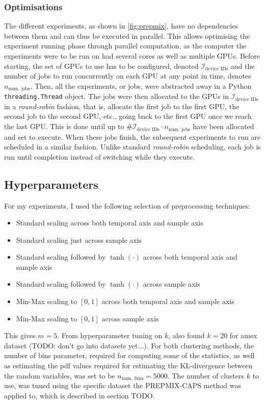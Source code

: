 \documentclass{statsmsc}
\begin{document}
\subsubsection{Optimisations}%
\label{ssub:Optimisations}

The different experiments, as shown in \cref{fig:prepmix}, have no dependencies
between them and can thus be executed in parallel. This allows optimising the
experiment running phase through parallel computation, as the computer the experiments were to
be run on had several cores as well as multiple \acp{GPU}. Before starting, the set of \acp{GPU}
to use has to be configured, denoted $\mathcal{I}_{\textrm{device IDs}}$ and the number of jobs
to run concurrently on each \ac{GPU} at any point in time, denotes $n_{\textrm{num. jobs}}$.
Then, all the experiments, or jobs, were abstracted away in a Python
\texttt{threading.Thread} object. The jobs were then allocated to the \acp{GPU} in
$\mathcal{I}_{\textrm{device IDs}}$ in a \textit{round-robin} fashion, that is, allocate the first
job to the first \ac{GPU}, the second job to the second \ac{GPU}, etc., going back to the first
\ac{GPU} once we reach the last \ac{GPU}. This is done until up to
$\# \mathcal{I}_{\textrm{device IDs}} \cdot n_{\textrm{num. jobs}}$ have been allocated and
set to execute. When these jobs finish, the subsequent experiments to run are scheduled in a similar
fashion. Unlike standard \textit{round-robin} scheduling, each job is run until completion instead
of switching while they execute.

\subsection{Hyperparameters}%
\label{sub:Hyperparameters}

For my experiments, I used the following selection of preprocessing techniques:
\begin{itemize}
    \item Standard scaling across both temporal axis and sample axis
    \item Standard scaling just across sample axis
    \item Standard scaling followed by $\tanh(\cdot)$ across both temporal axis and sample axis
    \item Standard scaling followed by $\tanh(\cdot)$ across sample axis
    \item Min-Max scaling to $[0,1]$ across both temporal axis and sample axis
    \item Min-Max scaling to $[0,1]$ across sample axis
\end{itemize}
This gives $m=5$. From hyperparameter tuning on $k$, also found $k=20$ for amex dataset
(TODO: don't go into datasets yet...).
For both clustering methods, the number of bins parameter, required for computing some of the
statistics, as well as estimating the \ac{pdf} values required for estimating the
\ac{KL-divergence} between the random variables, was set to be
$n_{\textrm{num. bins}}=5000$. The number of clusters $k$ to use, was tuned using the specific
dataset the \ac{PREPMIX-CAPS} method was applied to, which is described in section TODO.
\end{document}
